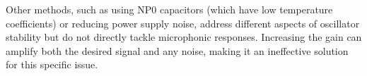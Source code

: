 Other methods, such as using NP0 capacitors (which have low temperature coefficients) or reducing power supply noise, address different aspects of oscillator stability but do not directly tackle microphonic responses. Increasing the gain can amplify both the desired signal and any noise, making it an ineffective solution for this specific issue.

